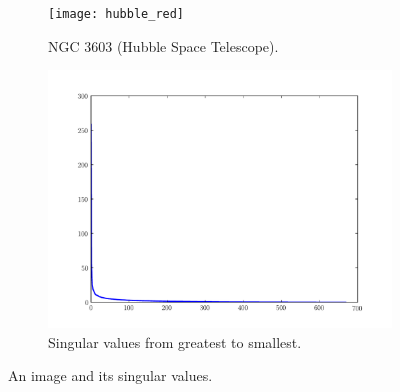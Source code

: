 \begin{figure}
\centering
\begin{subfigure}[b]{.49\textwidth}
\centering
\texttt{[image: hubble\_red]}
\caption{NGC 3603 (Hubble Space Telescope).}
\end{subfigure}
\begin{subfigure}[b]{.49\textwidth}
\centering
\includegraphics[width=\textwidth]{hubble_svals}
\caption{Singular values from greatest to smallest.}
\label{fig:svals_plot}
\end{subfigure}
\caption{An image and its singular values.}
\label{fig:hubble}
\end{figure}

